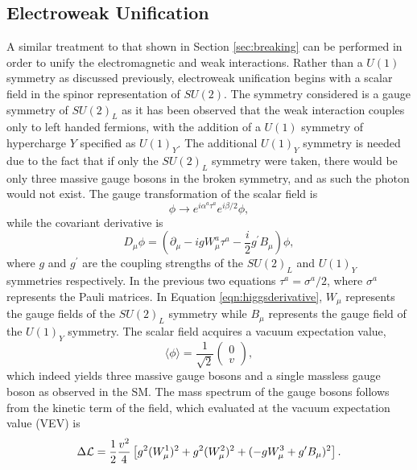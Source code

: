 \subsection{Electroweak Unification}
\label{sec:electroweak}
A similar treatment to that shown in Section \ref{sec:breaking} can be performed in order to unify the electromagnetic and weak interactions.
Rather than a $U(1)$ symmetry as discussed previously, electroweak unification begins with a scalar field in the spinor representation of $SU(2)$.
The symmetry considered is a gauge symmetry of $SU(2)_{L}$ as it has been observed that the weak interaction couples only to left handed fermions, with the addition of a $U(1)$ symmetry of hypercharge $Y$ specified as $U(1)_{Y}$.
The additional $U(1)_{Y}$ symmetry is needed due to the fact that if only the $SU(2)_{L}$ symmetry were taken, there would be only three massive gauge bosons in the broken symmetry, and as such the photon would not exist.
The gauge transformation of the scalar field is 
\begin{equation}
\phi \rightarrow e^{i\alpha^{a}\tau^{a}}e^{i\beta/2}\phi,
\end{equation}
while the covariant derivative is
\begin{equation}
\label{eqn:higgsderivative}
D_{\mu}\phi = (\partial_{\mu} - igW_{\mu}^{a}\tau^{a} - \frac{i}{2}g^{\prime}B_{\mu})\phi,
\end{equation}
where $g$ and $g^{\prime}$ are the coupling strengths of the $SU(2)_L$ and $U(1)_{Y}$ symmetries respectively.
In the previous two equations $\tau^{a} = \sigma^{a}/2$, where $\sigma^{a}$ represents the Pauli matrices.
In Equation \ref{eqn:higgsderivative}, $W_{\mu}$ represents the gauge fields of the $SU(2)_L$ symmetry while $B_{\mu}$ represents the gauge field of the $U(1)_{Y}$ symmetry.
The scalar field acquires a vacuum expectation value, 
\begin{equation}
\langle\phi\rangle = \frac{1}{\sqrt{2}}\begin{pmatrix}0 \\ v\end{pmatrix},
\end{equation}
which indeed yields three massive gauge bosons and a single massless gauge boson as observed in the SM.
The mass spectrum of the gauge bosons follows from the kinetic term of the field, which evaluated at the vacuum expectation value (VEV) is 
\begin{equation}
\label{eqn:higgsmassterms}
\Delta\mathcal{L} = \frac{1}{2}\frac{v^{2}}{4} \left[ g^{2}(W^{1}_{\mu})^{2} + g^{2}(W_{\mu}^{2})^{2} + (-gW_{\mu}^{3} + g^{\prime}B_{\mu})^{2} \right].
\end{equation}
